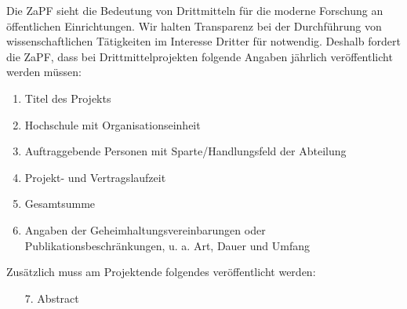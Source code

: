 Die ZaPF sieht die Bedeutung von Drittmitteln für die moderne Forschung an öffentlichen Einrichtungen. Wir halten Transparenz bei der Durchführung von wissenschaftlichen Tätigkeiten im Interesse Dritter für notwendig. Deshalb fordert die ZaPF, dass bei Drittmittelprojekten folgende Angaben jährlich veröffentlicht werden müssen:\\
\begin{enumerate}
\item Titel des Projekts \footnotemark[1]
\item Hochschule mit Organisationseinheit
\item Auftraggebende Personen mit Sparte/Handlungsfeld der Abteilung \footnotemark[2]
\item Projekt- und Vertragslaufzeit 
\item Gesamtsumme
\item Angaben der Geheimhaltungsvereinbarungen oder Publikationsbeschränkungen, u. a. Art, Dauer und Umfang
\end{enumerate}
Zusätzlich muss am Projektende folgendes veröffentlicht werden:
\begin{enumerate}
\item[7.] Abstract \footnotemark[1]
\end{enumerate}

